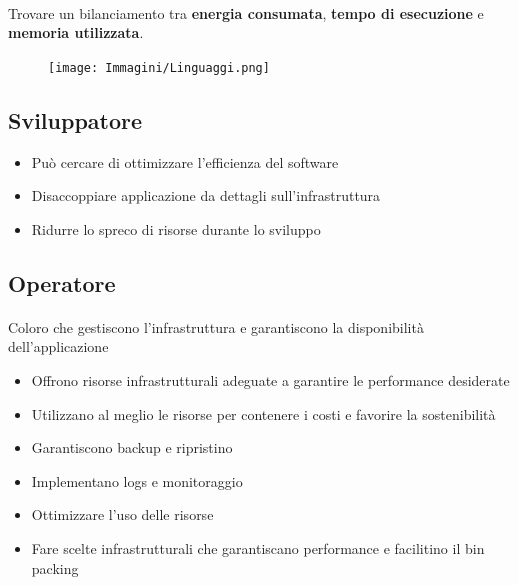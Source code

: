 \documentclass[a4paper, 12pt]{report}
\begin{document}
          \paragraph{}Trovare un bilanciamento tra \textbf{energia consumata}, \textbf{tempo di esecuzione} e \textbf{memoria utilizzata}.
          \begin{figure}[h]
            \centering
            \texttt{[image: Immagini/Linguaggi.png]}
          \end{figure}
          \subsection{Sviluppatore}
          \begin{itemize}
            \item Può cercare di ottimizzare l'efficienza del software 
            \item Disaccoppiare applicazione da dettagli sull'infrastruttura
            \item Ridurre lo spreco di risorse durante lo sviluppo
          \end{itemize}
          \subsection{Operatore}
          \paragraph{}Coloro che gestiscono l’infrastruttura e garantiscono la disponibilità dell’applicazione
          \begin{itemize}
            \item Offrono risorse infrastrutturali adeguate a garantire le performance desiderate
            \item Utilizzano al meglio le risorse per contenere i costi e favorire la sostenibilità
            \item Garantiscono backup e ripristino
            \item Implementano logs e monitoraggio
            \item Ottimizzare l’uso delle risorse
            \item Fare scelte infrastrutturali che garantiscano performance e facilitino il bin packing
          \end{itemize}
\end{document}
